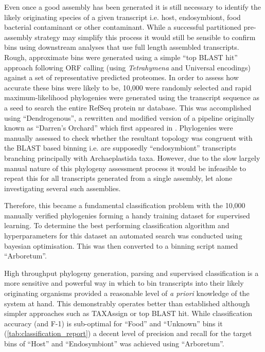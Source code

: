 Even once a good assembly has been generated it is still necessary to identify the likely
originating species of a given transcript i.e. host, endosymbiont, food bacterial contaminant or other
contaminant.  While a successful partitioned pre-assembly strategy may simplify this process it would still
be sensible to confirm bins using downstream analyses that use full length assembled transcripts.  Rough, approximate bins were
generated using a simple ``top BLAST hit'' approach following ORF calling (using \textit{Tetrahymena} and Universal
encodings) against a set of representative predicted proteomes.  In order to assess how accurate these
bins were likely to be, 10,000 were randomly selected and rapid maximum-likelihood phylogenies were
generated using the transcript sequence as a seed to search the entire RefSeq protein nr database.
This was accomplished using ``Dendrogenous'', a rewritten and modified version of a pipeline originally known 
as ``Darren's Orchard'' which first appeared in \citep{Richards2009g}.  Phylogenies were manually assessed to check
whether the resultant topology was congruent with the BLAST based binning i.e. are supposedly ``endosymbiont''
transcripts branching principally with Archaeplastida taxa.  
However, due to the slow largely manual nature of this phylogeny assessment process it would be infeasible
to repeat this for all transcripts generated from a single assembly, let alone investigating several such assemblies. 

Therefore, this became a fundamental classification problem with the 10,000 manually verified phylogenies
forming a handy training dataset for supervised learning.   To determine the best performing
classification algorithm and hyperparameters for this dataset an automated search was conducted 
using bayesian optimisation.  
This was then converted to a binning script named ``Arboretum''.


High throughput phylogeny generation, parsing and supervised classification is 
a more sensitive and powerful way in which to bin transcripts into their likely originating
organisms provided a reasonable level of \textit{a priori} knowledge of the system at hand.
This demonstrably operates better than established although simpler approaches such as
TAXAssign or top BLAST hit.  While classification accuracy (and F-1) is sub-optimal 
for ``Food'' and ``Unknown'' bins it (\cref{tab:classification_report}) a decent level of 
precision and recall for the target bins of ``Host'' and ``Endosymbiont'' was achieved
using ``Arboretum''.


